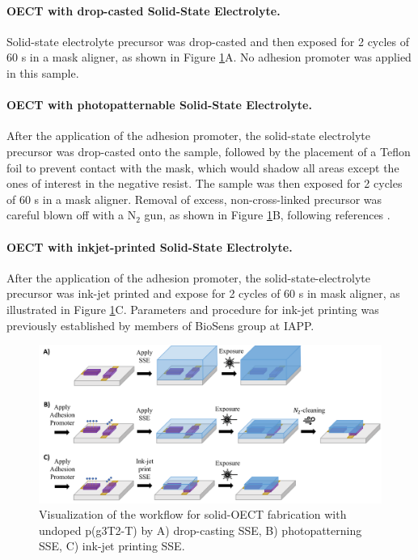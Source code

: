 \paragraph{OECT with drop-casted Solid-State Electrolyte.}Solid-state electrolyte precursor was drop-casted and then exposed for 2 cycles of 60 s in a mask aligner, as shown in Figure \ref{fig:undopedsse}A. No adhesion promoter was applied in this sample.

\paragraph{OECT with photopatternable Solid-State Electrolyte.}After the application of the adhesion promoter, the solid-state electrolyte precursor was drop-casted onto the sample, followed by the placement of a Teflon foil to prevent contact with the mask, which would shadow all areas except the ones of interest in the negative resist. The sample was then exposed for 2 cycles of 60 s in a mask aligner. Removal of excess, non-cross-linked precursor was careful blown off with a N$_{2}$ gun, as shown in Figure \ref{fig:undopedsse}B,  following references \cite{weissbachPhotopatternableSolidElectrolyte2022}\cite{bongartzOrganicElectrochemicalTransistors2021}.

\paragraph{OECT with inkjet-printed Solid-State Electrolyte.}After the application of the adhesion promoter, the solid-state-electrolyte precursor was ink-jet printed and expose for 2 cycles of 60 s in mask aligner, as illustrated in Figure \ref{fig:undopedsse}C. Parameters and procedure for ink-jet printing was previously established by members of BioSens group at IAPP. 

\begin{figure}[!ht]
	\centering
	\includegraphics[width=\textwidth]{Images/pdf/undoped-sse.pdf}
	\caption[Solid-OECT fabrication with undoped p(g3T2-T)]{Visualization of the workflow for solid-OECT fabrication with undoped p(g3T2-T) by A) drop-casting SSE, B) photopatterning SSE, C) ink-jet printing SSE.}
	\label{fig:undopedsse}
\end{figure}

